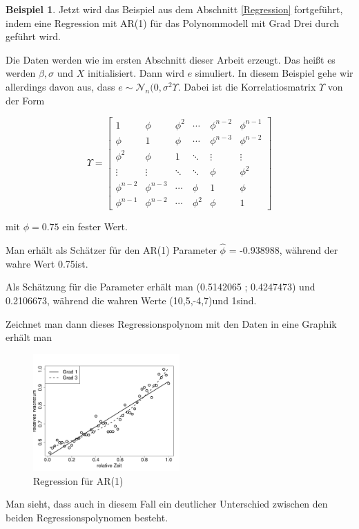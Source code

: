 \documentclass[12pt,a4paper]{article}
\theoremstyle{definition}
\newtheorem{Beispiel}[Definition]{Beispiel}
\theoremstyle{definition}
\theoremstyle{definition}
\theoremstyle{definition}
\newcommand{\betatrue}{(10,5,-4,7)}
\newcommand{\phitrue}{0.75}
\newcommand{\sigmatrue}{1}
\newcommand{\betaARone}{ (0.5142065 ; 0.4247473) }
\newcommand{\sigmaARone}{0.2106673}
\newcommand{\phiestone}{-0.938988}
\begin{document}
\begin{Beispiel}
Jetzt wird das Beispiel aus dem Abschnitt \ref{Regression} fortgeführt, indem eine Regression mit AR(1) für das Polynommodell mit Grad Drei durch geführt wird. 

Die Daten werden wie im ersten Abschnitt dieser Arbeit erzeugt. Das heißt es werden $\beta, \sigma$ und $X$ initialisiert. Dann wird $e$ simuliert. In diesem Beispiel gehe wir allerdings davon aus, dass $e \sim \mathscr{N}_n(0, \sigma^2 \Upsilon$. Dabei ist die Korrelatiosmatrix $\Upsilon$ von der Form 

\[
\Upsilon = 
\left[
   \begin{array}{cccccc}
     1 				& \phi 			& \phi^2	& \cdots	& \phi^{n-2}	& \phi^{n-1} 	\\
     \phi 			& 1		 		& \phi 		& \cdots	& \phi^{n-3}	& \phi^{n-2} 	\\
     \phi^2 		& \phi 			& 1		 	& \ddots	& \vdots		& \vdots 		\\
     \vdots		 	& \vdots	 	& \ddots	& \ddots	& \phi			& \phi^{2} 	\\
     \phi^{n-2} 	& \phi^{n-3}	& \cdots 	& \phi		& 1				& \phi 		\\
     \phi^{n-1} 	& \phi^{n-2} 	& \cdots	& \phi^{2}	& \phi			& 1  
   \end{array}
\right]
\]

mit $\phi = \phitrue$ ein fester Wert.

Man erhält als Schätzer für den AR(1) Parameter $\hat{\phi}$ = \phiestone , während der wahre Wert \phitrue ist.

Als Schätzung für die Parameter erhält man \betaARone und \sigmaARone , während die wahren Werte \betatrue und \sigmatrue sind. 

Zeichnet man dann dieses Regressionspolynom mit den Daten in eine Graphik erhält man

\begin{figure}[H] 
  \centering
     \includegraphics[width=0.5\textwidth]{Bsp-Reg-AR}
  \caption{Regression für AR(1)}
  \label{BSP-Reg-AR}
\end{figure}

Man sieht, dass auch in diesem Fall ein deutlicher Unterschied zwischen den beiden Regressionspolynomen besteht.

\end{Beispiel}
\end{document}
